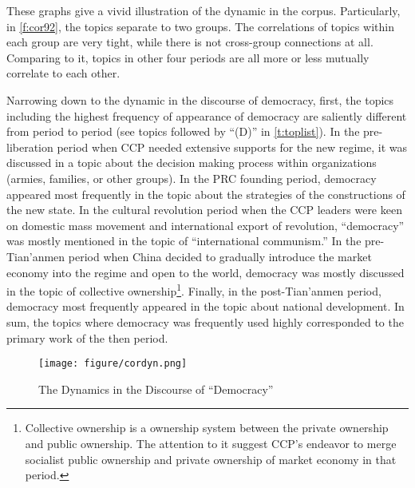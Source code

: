 \documentclass[abstracton,UTF8]{ctexart}
\begin{document}
These graphs give a vivid illustration of the dynamic in the corpus. Particularly, in \cref{f:cor92}, the topics separate to two groups. The correlations of topics within each group are very tight, while there is not cross-group connections at all. Comparing to it, topics in other four periods are all more or less mutually correlate to each other. 

Narrowing down to the dynamic in the discourse of democracy, first, the topics including the highest frequency of appearance of democracy are saliently different from period to period (see topics followed by ``(D)'' in \cref{t:toplist}). In the pre-liberation period when CCP needed extensive supports for the new regime, it was discussed in a topic about the decision making process within organizations (armies, families, or other groups). In the PRC founding period, democracy appeared most frequently in the topic about the strategies of the constructions of the new state. In the cultural revolution period when the CCP leaders were keen on domestic mass movement and international export of revolution, ``democracy'' was mostly mentioned in the topic of ``international communism.'' In the pre-Tian'anmen period when China decided to gradually introduce the market economy into the regime and open to the world, democracy was mostly discussed in the topic of collective ownership\footnote{Collective ownership is a ownership system between the private ownership and public ownership. The attention to it suggest CCP's endeavor to merge socialist public ownership and private ownership of market economy in that period.}. Finally, in the post-Tian'anmen period, democracy most frequently appeared in the topic about national development. In sum, the topics where democracy was frequently used highly corresponded to the primary work of the then period. 

\begin{figure}[htbp]
	\centering
	\caption{The Dynamics in the Discourse of ``Democracy''}\label{f:cordyn}
	\texttt{[image: figure/cordyn.png]}
\end{figure}
\end{document}
